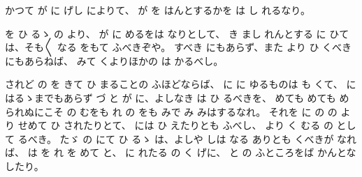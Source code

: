 
かつて
が
に
げし
によりて、
が
を
はんとするかを
は
し
れるなり。

を
ひ
るゝ
の
より、
が
に
めるをは
なりとして、
き
まし
れんとする
に
ひては、そも〳〵
なる
をもて
ふべきぞや。
すべき
にもあらず、また
より
ひ
くべき
にもあらねば、
みて
くよりほかの
は
かるべし。

されど
の
を
きて
ひ
まることの
ふほどならば、
に
に
ゆるものは
も
くて、
に
はるゝまでもあらず
づ
と
が
に、よしなき
は
ひ
るべきを、
めても
めても
められぬにこそ
の
むをも
れ
の
をも
みで
み
みはするなれ。
それを
に
の
の
より
せめて
ひ
されたりとて、
には
ひ
えたりとも
ふべし、
より
く
むる
の
として
るべき。
たゞ
の
にて
ひ
るゝ
は、よしや
しは
なる
ありとも
くべきが
なれば、
は
を
れ
を
めて
と、
に
れたる
の
く
げに、
と
の
ふところをば
かんとなしたり。


